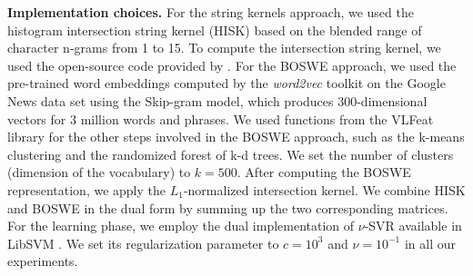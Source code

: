 \documentclass[11pt,a4paper]{article}
\begin{document}
\noindent
{\bf Implementation choices.}
For the string kernels approach, we used the histogram intersection string kernel (HISK) based on the blended range of character n-grams from 1 to 15. To compute the intersection string kernel, we used the open-source code provided by . For the BOSWE approach, we used the pre-trained word embeddings computed by the \emph{word2vec} toolkit \cite{Mikolov-NIPS-2013} on the Google News data set using the Skip-gram model, which produces $300$-dimensional vectors for $3$ million words and phrases. We used functions from the VLFeat library \cite{vedaldi-vlfeat-2008} for the other steps involved in the BOSWE approach, such as the k-means clustering and the randomized forest of k-d trees. We set the number of clusters (dimension of the vocabulary) to $k = 500$. After computing the BOSWE representation, we apply the $L_1$-normalized intersection kernel. We combine HISK and BOSWE in the dual form by summing up the two corresponding matrices. For the learning phase, we employ the dual implementation of $\nu$-SVR available in LibSVM \cite{LibSVM-2011}. We set its regularization parameter to $c=10^3$ and $\nu = 10^{-1}$ in all our experiments.
\end{document}
